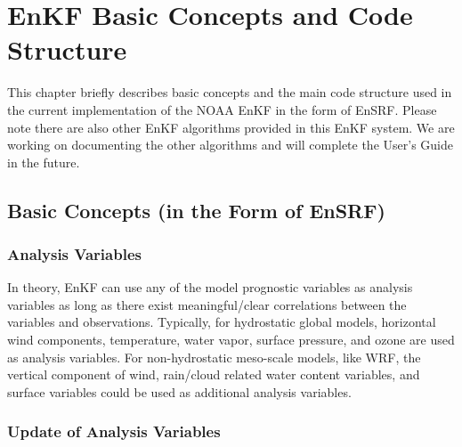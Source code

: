 \chapter{EnKF Basic Concepts and Code Structure}\label{enkf_structure}
\setlength{\parskip}{12pt}

This chapter briefly describes basic concepts and the main code structure used in the current implementation of the NOAA EnKF in the form of EnSRF. Please note there are also other EnKF algorithms provided in this EnKF system. We are working on documenting the other algorithms and will complete the User's Guide in the future. 
\section{Basic Concepts (in the Form of EnSRF)}
\subsection{Analysis Variables}

In theory, EnKF can use any of the model prognostic variables as analysis variables as long as there exist meaningful/clear correlations between the variables and observations. Typically, for hydrostatic global models, horizontal wind components, temperature, water vapor, surface pressure, and ozone are used as analysis variables. For non-hydrostatic meso-scale models, like WRF, the vertical component of wind, rain/cloud related water content variables, and surface variables could be used as additional analysis variables.

\subsection{Update of Analysis Variables}


